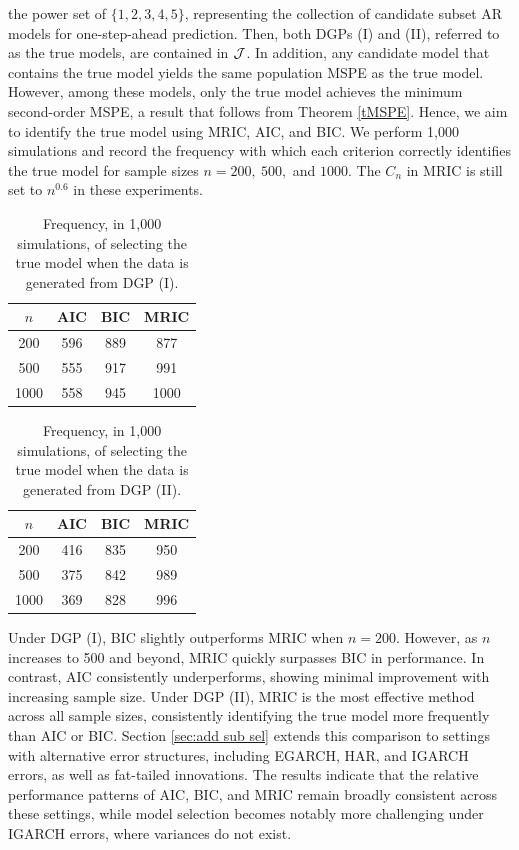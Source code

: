 \documentclass[ejsv2]{imsart}
\theoremstyle{plain}
\theoremstyle{definition}
\theoremstyle{remark}
\begin{document}
the power set of $\{1,2,3,4,5\}$,
representing the collection of candidate subset AR models for one-step-ahead prediction.
Then,
both DGPs (I) and (II),
referred to as the true models, are
contained in ${\cal J}$.
In addition, any candidate model that contains the true model yields the same population MSPE as the true model. 
However, among these models, only the true model achieves the minimum second-order MSPE,
a result that follows from 
Theorem \ref{tMSPE}.
Hence, we aim to identify the true model using MRIC, AIC, and BIC.
We perform 1,000 simulations and
record the frequency with which each criterion correctly identifies the true model
for sample sizes $n=200,\ 500,$ and $1000$. 
The $C_n$ in MRIC is still set to $n^{0.6}$ in these experiments.

\begin{table}
\caption{Frequency, in 1,000 simulations, of selecting the true model when the data is generated from DGP {\rm (I)}.}
\label{tabS9.1}
\centering
\begin{tabular}{cccc}
  $n$ & AIC & BIC & MRIC \\ \hline
    200 & 596 & 889 & 877 \\
    500 & 555 & 917 & 991  \\
    1000 & 558 & 945 & 1000 \\  \hline
  \end{tabular}
\end{table}

\begin{table}
\caption{Frequency, in 1,000 simulations, of selecting the true model when the data is generated from DGP {\rm (II)}.}
\label{tabS9.2}
\centering
\begin{tabular}{cccc}
  $n$ & AIC & BIC & MRIC \\ \hline
    200 & 416 & 835 & 950 \\
    500 & 375 & 842 & 989  \\
    1000 & 369 & 828 & 996 \\  \hline
  \end{tabular}
\end{table}
Under DGP (I), BIC slightly outperforms MRIC when 
$n=200$. However, as 
$n$ increases to 500 and beyond, 
MRIC quickly surpasses BIC in performance. 
In contrast, AIC consistently underperforms, 
showing minimal improvement with increasing sample size.
Under DGP (II), MRIC is the most effective method across all sample sizes, consistently identifying the true model more frequently than AIC or BIC. 
Section \ref{sec:add sub sel}
extends this comparison to settings with alternative error structures, including EGARCH, HAR, and IGARCH errors, as well as fat-tailed innovations.
The results indicate that the relative performance patterns of AIC, BIC, and MRIC remain broadly consistent across these settings, while model selection becomes notably more challenging under IGARCH errors, where variances do not exist.
\end{document}
